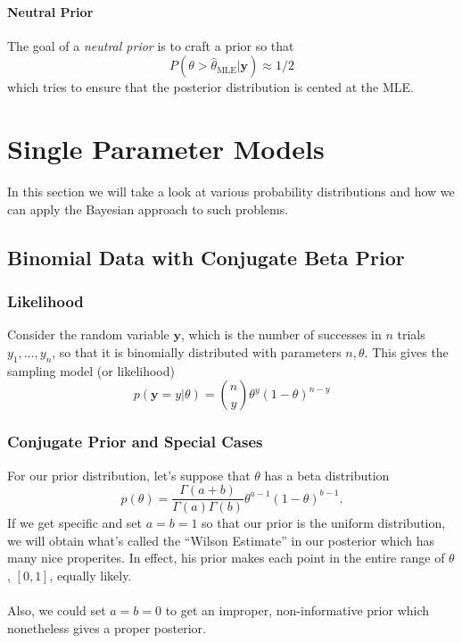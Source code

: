 \documentclass[a4paper,12pt]{scrartcl}
\begin{document}
\paragraph{Neutral Prior} The goal of a \emph{neutral prior} is to
craft a prior so that
   \[ P(\theta > \hat{\theta}_{\text{MLE}} | \mathbf{y}) \approx 1/2 \]
which tries to ensure that the posterior distribution is cented at the 
MLE.




\newpage

\section{Single Parameter Models}

In this section we will take a look at various probability distributions
and how we can apply the Bayesian approach to such problems.


\subsection{Binomial Data with Conjugate Beta Prior}

\subsubsection{Likelihood}

Consider the random variable $\mathbf{y}$, 
which is the number of successes in
$n$ trials $y_1, \ldots, y_n$, so that it is binomially distributed
with parameters $n,\theta$. This gives the sampling model (or 
likelihood)
   \[p(\mathbf{y} = y | \theta) = \binom{n}{y} \theta^y (1-\theta)^{n-y}
      \]

\subsubsection{Conjugate Prior and Special Cases}

For our prior distribution, let's suppose that $\theta$ has a beta
distribution
   \[ p(\theta) = \frac{\Gamma(a + b)}{\Gamma(a)\Gamma(b)}
      \theta^{a-1}(1-\theta)^{b-1}.\]
If we get specific and set $a=b=1$ so that our prior is the uniform
distribution,
we will obtain what's called the ``Wilson Estimate'' in our
posterior which has
many nice properites. In effect, his prior makes each point in the 
entire range of $\theta$, $[0,1]$, equally likely.
\\
\\
Also, we could set $a=b=0$ to get an improper, non-informative prior
which nonetheless gives a proper posterior.
\end{document}
